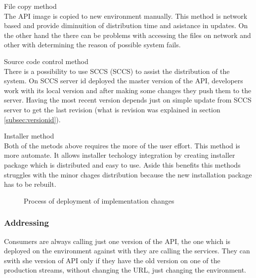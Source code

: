 \begin{description}
  \item{File copy method} \hfill \\
  The API image is copied to new environment manually. This method is network based and provide diminuition of distribution time and asistance in updates. On the other hand the there can be problems with accessing the files on network and other with determining the reason of possible system fails. 
  \item{Source code control method} \hfill \\
  There is a possibility to use \gls{SCCS} (SCCS) to assist the distribution of the system. On SCCS server id deployed the master version of the API, developers work with its local version and after making some changes they push them to the server. Having the most recent version depends just on simple update from SCCS server to get the last revision (what is revision was explained in section \ref{subsec:versionid}). 
  \item{Installer method} \hfill \\
  Both of the metods above requires the more of the user effort. This method is more automate. It allows installer techology integration by creating installer package which is distributed and easy to use. Aside this benefits this methods struggles with the minor chages distribution because the new installation package has to be rebuilt.
\end{description}


\begin{figure}[htp] 
\caption{Process of deployment of implementation changes}
\label{fig:service-implementation}
\end{figure} 

\subsubsection{Addressing}
Consumers are always calling just one version of the API, the one which is deployed on the environment against with they are calling the services. They can swith she version of API only if they have the old version on one of the production streams, without changing the URL, just changing the environment. 

